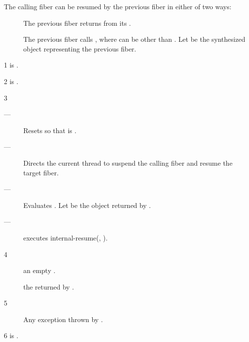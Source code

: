 The calling fiber can be resumed by the previous fiber in either of two ways:

\begin{description}
    \item[] The previous fiber returns  from its \entryfn.
    \item[] The previous fiber
          calls , where  can be
          other than . Let  be the synthesized \fiber
          object representing the previous fiber.
\end{description}

1 \mandates
{} is \true.

2 \precond
\canresume is \true.

3 \effects
\begin{description}
    \item[---] Resets \state so that \emptyfn is \true.
    \item[---] Directs the current thread to suspend the calling fiber and resume
               the target fiber.
    \item[---] Evaluates .
               Let  be the \fiber object returned by .
    \item[---] executes internal-resume(, ).
\end{description}

4 \returns
\begin{description}
    \item[] an empty \fiber.
    \item[] the \fiber returned
    by .
\end{description}

5 \except
\begin{description}
    \item[] Any exception thrown by .
\end{description}

6 \postcond
\emptyfn is \true.


